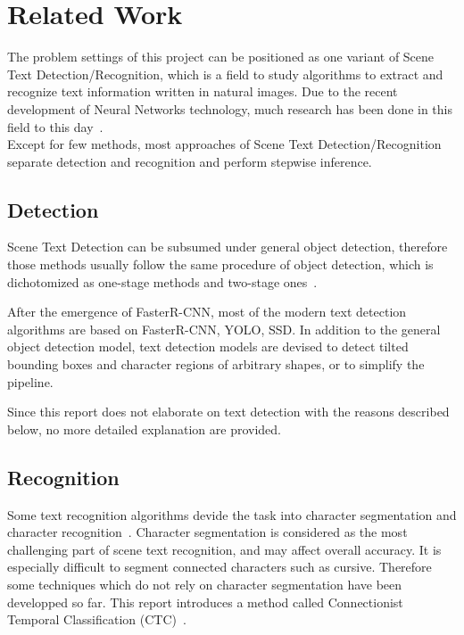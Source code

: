 \section{Related Work}

The problem settings of this project can be positioned as one variant of Scene Text Detection/Recognition, which
is a field to study algorithms to extract and recognize text information written in natural images.
Due to the recent development of Neural Networks technology,
much research has been done in this field to this day~\cite{long2018scene}.\\
Except for few methods\cite{liu2018fots}\cite{lyu2018mask}, most approaches of Scene Text Detection/Recognition
separate detection and recognition and perform stepwise inference.

\subsection{Detection}

Scene Text Detection can be subsumed under general object detection, therefore those methods usually follow
the same procedure of object detection, which is dichotomized as one-stage methods and two-stage ones~\cite{liu2018deep}.

After the emergence of FasterR-CNN\cite{ren2015faster}, most of the modern text detection algorithms
are based on FasterR-CNN, YOLO\cite{redmon2016you}, SSD\cite{liu2016ssd}. In addition to the
general object detection model, text detection models are devised to detect tilted bounding boxes
and character regions of arbitrary shapes, or to simplify the pipeline.

Since this report does not elaborate on text detection with the reasons described below,
no more detailed explanation are provided.

\subsection{Recognition}

Some text recognition algorithms devide the task into character segmentation and character recognition~\cite{bissacco2013photoocr}\cite{phan2011gradient}.
Character segmentation is considered as the most challenging part of scene text recognition, and may affect
overall accuracy. It is especially difficult to segment connected characters such as cursive.
Therefore some techniques which do not rely on character segmentation have been developped so far.
This report introduces a method called Connectionist Temporal Classification (CTC)~\cite{graves2006connectionist}.

